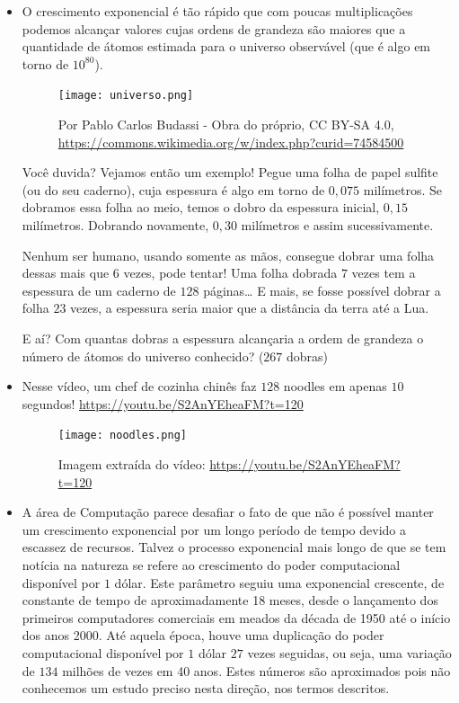 \begin{knowledge}

\begin{itemize}
\item O crescimento exponencial é tão rápido que com poucas multiplicações podemos alcançar valores cujas ordens de grandeza são maiores que a quantidade de átomos estimada para o universo observável (que é algo em torno de $10^{80}$).
\begin{figure}[H]
\centering
\texttt{[image: universo.png]}
\caption{Por Pablo Carlos Budassi - Obra do próprio, CC BY-SA 4.0, \url{https://commons.wikimedia.org/w/index.php?curid=74584500}}
\end{figure}

Você duvida? Vejamos então um exemplo! Pegue uma folha de papel sulfite (ou do seu caderno), cuja espessura é algo em torno de $0{,}075$ milímetros. Se dobramos essa folha ao meio, temos o dobro da espessura inicial, $0{,}15$ milímetros. Dobrando novamente, $0{,}30$ milímetros e assim sucessivamente.

Nenhum ser humano, usando somente as mãos, consegue dobrar uma folha dessas mais que $6$ vezes, pode tentar! Uma folha dobrada $7$ vezes tem a espessura de um caderno de $128$ páginas… E mais, se fosse possível dobrar a folha $23$ vezes, a espessura seria maior que a distância da terra até a Lua.

E aí? Com quantas dobras a espessura alcançaria a ordem de grandeza o número de átomos do universo conhecido? ($267$ dobras)


\item Nesse vídeo, um chef de cozinha chinês faz $128$ noodles em apenas $10$ segundos!
\url{https://youtu.be/S2AnYEheaFM?t=120}

\begin{figure}[H]
\centering
\texttt{[image: noodles.png]}
\caption{Imagem extraída do vídeo: \url{https://youtu.be/S2AnYEheaFM?t=120}}
\end{figure}

\item A área de Computação parece desafiar o fato de que não é possível manter um crescimento exponencial por um longo período de tempo devido a escassez de recursos. Talvez o processo exponencial mais longo de que se tem notícia na natureza se refere ao crescimento do poder computacional disponível por $1$ dólar. Este parâmetro seguiu uma exponencial crescente, de constante de tempo de aproximadamente 18 meses, desde o lançamento dos primeiros computadores comerciais em meados da década de 1950 até o início dos anos 2000. Até aquela época, houve uma duplicação do poder computacional disponível por $1$ dólar $27$ vezes seguidas, ou seja, uma variação de $134$ milhões de vezes em 40 anos. Estes números são aproximados pois não conhecemos um estudo preciso nesta direção, nos termos descritos.


\end{itemize}
\end{knowledge}
